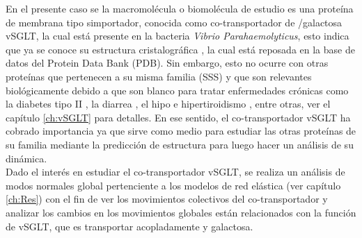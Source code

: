 En el presente caso se la macromol\'{e}cula o biomol\'{e}cula de estudio es una prote\'{i}na de membrana tipo simportador, conocida como co-transportador de /galactosa vSGLT, la cual est\'{a} presente en la bacteria \textit{Vibrio Parahaemolyticus}, esto indica que ya se conoce su estructura cristalogr\'{a}fica \cite{Faham2008}, la cual est\'{a} reposada en la base de datos del Protein Data Bank (PDB). Sin embargo, esto no ocurre con otras prote\'{i}nas que pertenecen a su misma familia (SSS) y que son relevantes biol\'{o}gicamente debido a que son blanco  para tratar enfermedades cr\'{o}nicas como la diabetes tipo II \cite{Bisha2014}, la diarrea \cite{Hamilton2013}, el hipo e hipertiroidismo \cite{Ferrandino2016}, entre otras, ver el cap\'{i}tulo  \ref{ch:vSGLT} para detalles. En ese sentido, el co-transportador vSGLT ha cobrado importancia ya que sirve como medio para estudiar las otras prote\'{i}nas de su familia mediante la predicci\'{o}n de estructura para luego hacer un an\'{a}lisis de su din\'{a}mica.\\

Dado el inter\'{e}s en estudiar el co-transportador vSGLT, se realiza un an\'{a}lisis de modos normales global pertenciente a los modelos de red el\'{a}stica (ver cap\'{i}tulo \ref{ch:Res}) con el fin de ver los movimientos colectivos del co-transportador y analizar los cambios en los movimientos globales est\'{a}n relacionados con la funci\'{o}n de vSGLT, que es transportar acopladamente  y galactosa.\\
